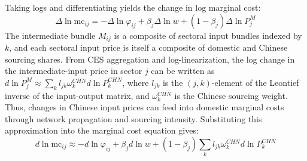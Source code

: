 \documentclass[12pt]{article}
\begin{document}
Taking logs and differentiating yields the change in log marginal cost:
\[\Delta \ln \text{mc}_{ij} = -\Delta \ln \varphi_{ij} + \beta_j \Delta \ln w + (1-\beta_j) \Delta \ln P^M_j\]
The intermediate bundle $M_{ij}$ is a composite of sectoral input bundles indexed by $k$, and each sectoral input price is itself a composite of domestic and Chinese sourcing shares. From CES aggregation and log-linearization, the log change in the intermediate-input price in sector $j$ can be written as $d \ln P^M_{j} \approx \sum_k l_{jk} \omega_k^{CHN} d \ln P^{CHN}_{k}$, where $l_{jk}$ is the $(j,k)$-element of the Leontief inverse of the input-output matrix, and $\omega_k^{CHN}$ is the Chinese sourcing weight. Thus, changes in Chinese input prices can feed into domestic marginal costs through network propagation and sourcing intensity. Substituting this approximation into the marginal cost equation gives: 
\begin{equation}
d \ln \text{mc}_{ij} \approx -d \ln \varphi_{ij} + \beta_j d \ln w + (1-\beta_j) \sum_k l_{jk} \omega_k^{CHN} d \ln P^{CHN}_{k}
\end{equation}
\end{document}

